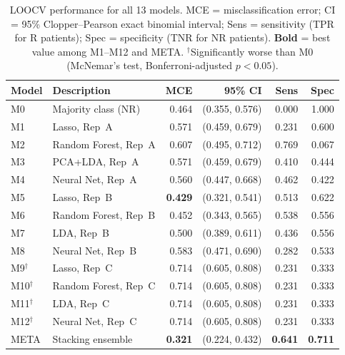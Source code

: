 \documentclass[12pt, onecolumn]{article}
\begin{document}
\begin{table}[H]
\centering
\caption{LOOCV performance for all 13 models. MCE =
  misclassification error; CI = 95\% Clopper--Pearson exact
  binomial interval; Sens = sensitivity (TPR for R patients);
  Spec = specificity (TNR for NR patients). \textbf{Bold} =
  best value among M1--M12 and META.
  $^\dagger$Significantly worse than M0 (McNemar's test,
  Bonferroni-adjusted $p < 0.05$).}
\label{tab:results}
\small
\setlength{\tabcolsep}{5pt}
\renewcommand{\arraystretch}{1.25}
\begin{tabularx}{\textwidth}{llrrrr}
\toprule
\textbf{Model} & \textbf{Description}
  & \textbf{MCE} & \textbf{95\% CI}
  & \textbf{Sens} & \textbf{Spec} \\
\midrule
M0  & Majority class (NR)
    & 0.464 & (0.355, 0.576) & 0.000 & 1.000 \\
\midrule
M1  & Lasso, Rep~A
    & 0.571 & (0.459, 0.679) & 0.231 & 0.600 \\
M2  & Random Forest, Rep~A
    & 0.607 & (0.495, 0.712) & 0.769 & 0.067 \\
M3  & PCA+LDA, Rep~A
    & 0.571 & (0.459, 0.679) & 0.410 & 0.444 \\
M4  & Neural Net, Rep~A
    & 0.560 & (0.447, 0.668) & 0.462 & 0.422 \\
\midrule
M5  & Lasso, Rep~B
    & \textbf{0.429} & (0.321, 0.541) & 0.513 & 0.622 \\
M6  & Random Forest, Rep~B
    & 0.452 & (0.343, 0.565) & 0.538 & 0.556 \\
M7  & LDA, Rep~B
    & 0.500 & (0.389, 0.611) & 0.436 & 0.556 \\
M8  & Neural Net, Rep~B
    & 0.583 & (0.471, 0.690) & 0.282 & 0.533 \\
\midrule
M9$^\dagger$  & Lasso, Rep~C
    & 0.714 & (0.605, 0.808) & 0.231 & 0.333 \\
M10$^\dagger$ & Random Forest, Rep~C
    & 0.714 & (0.605, 0.808) & 0.231 & 0.333 \\
M11$^\dagger$ & LDA, Rep~C
    & 0.714 & (0.605, 0.808) & 0.231 & 0.333 \\
M12$^\dagger$ & Neural Net, Rep~C
    & 0.714 & (0.605, 0.808) & 0.231 & 0.333 \\
\midrule
META & Stacking ensemble
    & \textbf{0.321} & (0.224, 0.432)
    & \textbf{0.641} & \textbf{0.711} \\
\bottomrule
\end{tabularx}
\end{table}
\end{document}
